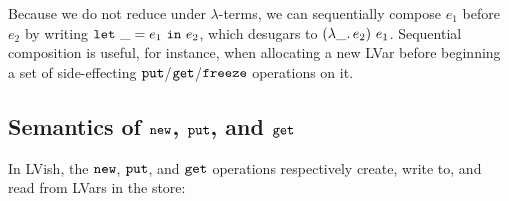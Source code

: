 

Because we do not reduce under $\lambda$-terms, we can sequentially
compose $e_1$ before $e_2$ by writing $\mbox{\texttt{let}}~\_=e_1~\mbox{\texttt{in}}~e_2$, which
desugars to $(\lambda\_.\,e_2)~e_1$.  Sequential composition is
useful, for instance, when allocating a new LVar before beginning a
set of side-effecting $\mbox{\texttt{put}}$/$\mbox{\texttt{get}}$/$\mbox{\texttt{freeze}}$ operations on it.

\subsection{Semantics of $\mbox{\texttt{new}}$, $\mbox{\texttt{put}}$, and $\mbox{\texttt{get}}$}\label{subsection:newputget}

In LVish, the $\mbox{\texttt{new}}$, $\mbox{\texttt{put}}$, and $\mbox{\texttt{get}}$ operations respectively create,
write to, and read from LVars in the store:

